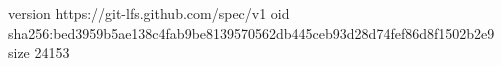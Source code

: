 version https://git-lfs.github.com/spec/v1
oid sha256:bed3959b5ae138c4fab9be8139570562db445ceb93d28d74fef86d8f1502b2e9
size 24153
